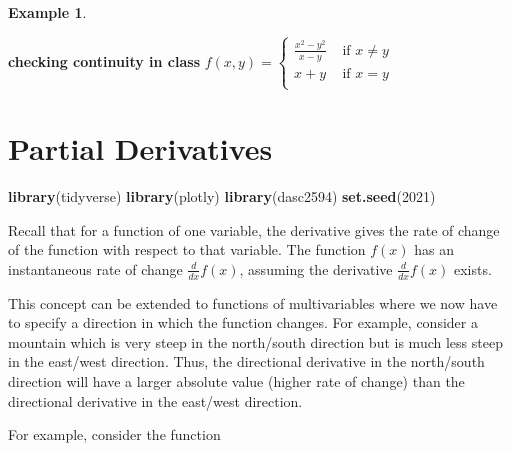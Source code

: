 \documentclass[
]{book}
\newenvironment{Shaded}{\begin{snugshade}}{\end{snugshade}}
\newcommand{\DecValTok}[1]{\textcolor[rgb]{0.00,0.00,0.81}{#1}}
\newcommand{\KeywordTok}[1]{\textcolor[rgb]{0.13,0.29,0.53}{\textbf{#1}}}
\newcommand{\NormalTok}[1]{#1}
\theoremstyle{definition}
\theoremstyle{definition}
\newtheorem{example}{Example}[chapter]
\theoremstyle{definition}
\theoremstyle{remark}
\begin{document}
\begin{example}
\protect\hypertarget{exm:unlabeled-div-213}{}\label{exm:unlabeled-div-213}

\textbf{checking continuity in class}
\(f(x, y) = \begin{cases} \frac{x^2 - y^2}{x - y} & \mbox{ if } x \neq y \\ x + y & \mbox{ if } x = y \\ \end{cases}\)

\end{example}

\hypertarget{partial-derivatives}{%
\chapter{Partial Derivatives}\label{partial-derivatives}}

\begin{Shaded}
\begin{Highlighting}[]
\KeywordTok{library}\NormalTok{(tidyverse)}
\KeywordTok{library}\NormalTok{(plotly)}
\KeywordTok{library}\NormalTok{(dasc2594)}
\KeywordTok{set.seed}\NormalTok{(}\DecValTok{2021}\NormalTok{)}
\end{Highlighting}
\end{Shaded}

Recall that for a function of one variable, the derivative gives the rate of change of the function with respect to that variable. The function \(f(x)\) has an instantaneous rate of change \(\frac{d}{dx}f(x)\), assuming the derivative \(\frac{d}{dx}f(x)\) exists.

This concept can be extended to functions of multivariables where we now have to specify a direction in which the function changes. For example, consider a mountain which is very steep in the north/south direction but is much less steep in the east/west direction. Thus, the directional derivative in the north/south direction will have a larger absolute value (higher rate of change) than the directional derivative in the east/west direction.

For example, consider the function
\end{document}
